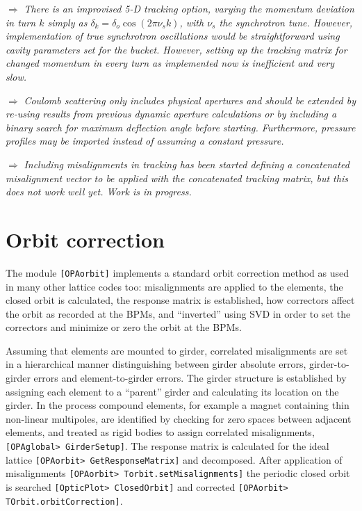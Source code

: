 \documentclass[12pt]{article}
\newcommand\todo[1]{$\Longrightarrow$ {\em #1} }
\newcommand\code[1]{{\tt [#1]}}
\begin{document}
\todo{There is an improvised 5-D tracking option, varying the momentum deviation
in turn $k$ simply as $\delta_k = \delta_o \cos (2\pi \nu_s k)$, with $\nu_s$ the
synchrotron tune. However, implementation of true synchrotron oscillations would be straightforward using cavity parameters set for the bucket. However, setting up the tracking matrix for changed momentum in every turn as implemented now is inefficient and very slow.}

\todo{Coulomb scattering only includes physical apertures and should be extended by re-using results from previous dynamic aperture calculations or by including a binary search for maximum deflection angle before starting. Furthermore, pressure profiles may be imported instead of assuming a constant pressure.}

\todo{Including misalignments in tracking has been started defining a concatenated misalignment vector to be applied with the concatenated tracking matrix, but this does not work well yet. Work is in progress.}

\section{Orbit correction}
The module \code{OPAorbit} implements a standard orbit correction method as used in many other lattice codes too: misalignments are applied to the elements, the closed orbit is calculated, the response matrix is established, how correctors affect the orbit as recorded at the BPMs, and ``inverted'' using SVD \cite{numrec} in order to set the correctors and minimize or zero the orbit at the BPMs.

Assuming that elements are mounted to girder, correlated misalignments are set in a hierarchical manner distinguishing between girder absolute errors, girder-to-girder errors and element-to-girder errors. The girder structure is established by assigning each element to a ``parent'' girder and calculating its location on the girder. In the process compound elements, for example a magnet containing thin non-linear multipoles, are identified by checking for zero spaces between adjacent elements, and treated as rigid bodies to assign correlated misalignments, \code{OPAglobal> GirderSetup}.
The response matrix is calculated for the ideal lattice \code{OPAorbit> GetResponseMatrix} and decomposed.
After application of misalignments \code{OPAorbit> Torbit.setMisalignments} the periodic closed orbit is searched \code{OpticPlot> ClosedOrbit} and corrected \code{OPAorbit> TOrbit.orbitCorrection}.
\end{document}
